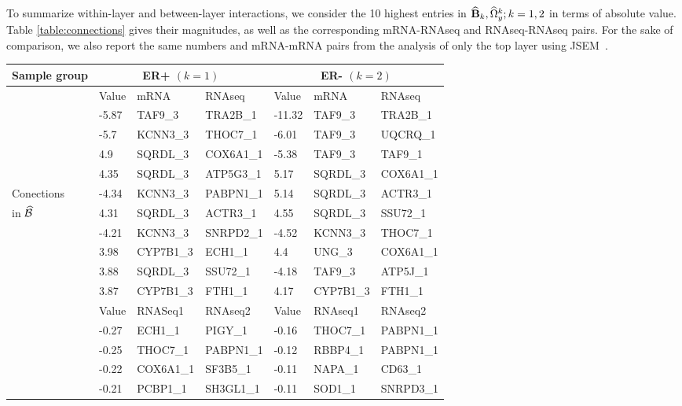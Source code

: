 To summarize within-layer and between-layer interactions, we consider the 10 highest entries in $\widehat {{\mathbf{B}}}_k, \widehat \Omega_y^k; k = 1,2$ in terms of absolute value. Table \ref{table:connections} gives their magnitudes, as well as the corresponding mRNA-RNAseq and RNAseq-RNAseq pairs. For the sake of comparison, we also report the same numbers and mRNA-mRNA pairs from the analysis of only the top layer using JSEM~\citep{MaMichailidis15}.

\begin{table}[t!]
\centering
    \begin{tabular}{l|lll|lll}
    \hline
Sample group & \multicolumn{3}{c}{ER+ $(k=1)$} & \multicolumn{3}{c}{ER- $(k=2)$} \\\hline
    ~ & Value & mRNA      &  RNAseq   & Value  & mRNA      &  RNAseq   \\ \hline
    ~ & -5.87 & TAF9\_3   & TRA2B\_1  & -11.32 & TAF9\_3   & TRA2B\_1  \\
    ~ & -5.7  & KCNN3\_3  & THOC7\_1  & -6.01  & TAF9\_3   & UQCRQ\_1  \\
    ~ & 4.9   & SQRDL\_3  & COX6A1\_1 & -5.38  & TAF9\_3   & TAF9\_1   \\
    ~ & 4.35  & SQRDL\_3  & ATP5G3\_1 & 5.17   & SQRDL\_3  & COX6A1\_1 \\
Conections & -4.34 & KCNN3\_3  & PABPN1\_1 & 5.14   & SQRDL\_3  & ACTR3\_1  \\
in $\widehat {{\cal{B}}}$ & 4.31  & SQRDL\_3  & ACTR3\_1  & 4.55   & SQRDL\_3  & SSU72\_1  \\
    ~ & -4.21 & KCNN3\_3  & SNRPD2\_1 & -4.52  & KCNN3\_3  & THOC7\_1  \\
    ~ & 3.98  & CYP7B1\_3 & ECH1\_1   & 4.4    & UNG\_3    & COX6A1\_1 \\
    ~ & 3.88  & SQRDL\_3  & SSU72\_1  & -4.18  & TAF9\_3   & ATP5J\_1  \\
    ~ & 3.87  & CYP7B1\_3 & FTH1\_1   & 4.17   & CYP7B1\_3 & FTH1\_1   \\ \hline
    \hline
    ~ & Value &    RNASeq1 &  RNAseq2  & Value &  RNAseq1 &  RNAseq2     \\ \hline
    ~ & -0.27 & ECH1\_1    & PIGY\_1   & -0.16 & THOC7\_1 & PABPN1\_1    \\
    ~ & -0.25 & THOC7\_1   & PABPN1\_1 & -0.12 & RBBP4\_1 & PABPN1\_1    \\
    ~ & -0.22 & COX6A1\_1  & SF3B5\_1  & -0.11 & NAPA\_1  & CD63\_1      \\
    ~ & -0.21 & PCBP1\_1   & SH3GL1\_1 & -0.11 & SOD1\_1  & SNRPD3\_1    \\

\end{tabular}
\end{table}
